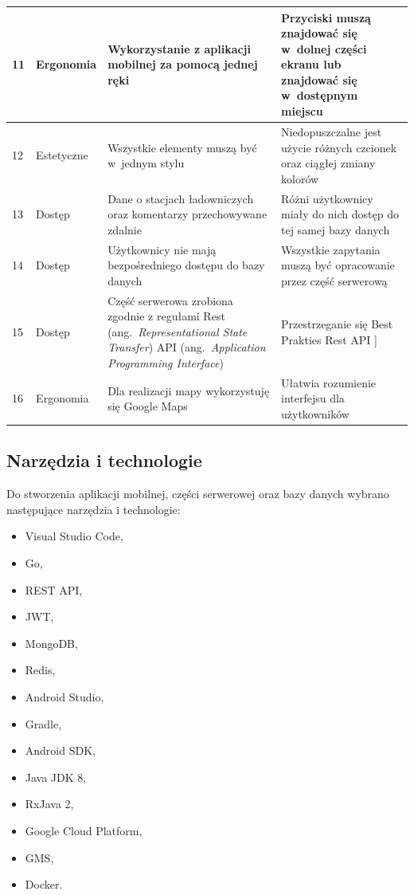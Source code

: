 \begin{table}[htb]
\begin{tabularx}{\linewidth}{| l| l |X | X |}
    \hline
    11 & Ergonomia & Wykorzystanie z aplikacji mobilnej za pomocą jednej ręki & Przyciski muszą znajdować się w~dolnej części ekranu lub znajdować się w~dostępnym miejscu \\
    \hline
    12 & Estetyczne & Wszystkie elementy muszą być w~jednym stylu & Niedopuszczalne jest użycie różnych czcionek oraz ciągłej zmiany kolorów \\
    \hline
    13 & Dostęp & Dane o stacjach ładowniczych oraz komentarzy przechowywane zdalnie & Różni użytkownicy miały do nich dostęp do tej samej bazy danych \\
    \hline
    14 & Dostęp & Użytkownicy nie mają bezpośredniego dostępu do bazy danych & Wszystkie zapytania muszą być opracowanie przez część serwerową \\
    \hline
    15 & Dostęp & Część serwerowa zrobiona zgodnie z regułami Rest (ang.~\emph{Representational State Transfer}) API (ang.~\emph{Application Programming Interface}) & Przestrzeganie się Best Prakties Rest API \cite{rest_api_best}] \\
    \hline
    16 & Ergonomia & Dla realizacji mapy wykorzystuję się Google Maps & Ułatwia rozumienie interfejsu dla użytkowników \\
    \hline
\end{tabularx}
\end{table}
\newpage
\subsection{Narzędzia i technologie}
Do stworzenia aplikacji mobilnej, części serwerowej oraz bazy danych wybrano następujące narzędzia i technologie:
\begin{multicols}{3}
\begin{itemize}
    \item Visual Studio Code,
    \item Go,
    \item REST API,
    \item JWT,
    \item MongoDB,
    \item Redis,
    \item Android Studio,
    \item Gradle,
    \item Android SDK,
    \item Java JDK 8,
    \item RxJava 2,
    \item Google Cloud Platform,
    \item GMS,
    \item Docker.
\end{itemize}
\end{multicols}


